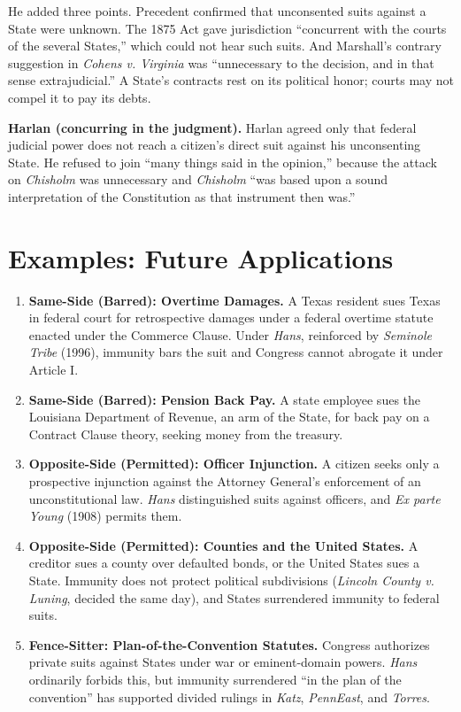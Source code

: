 \documentclass[12pt]{article}
\begin{document}
He added three points. Precedent confirmed that unconsented suits against a State were unknown. The 1875 Act gave jurisdiction ``concurrent with the courts of the several States,'' which could not hear such suits. And Marshall's contrary suggestion in \textit{Cohens v. Virginia} was ``unnecessary to the decision, and in that sense extrajudicial.'' A State's contracts rest on its political honor; courts may not compel it to pay its debts.

\textbf{Harlan (concurring in the judgment).} Harlan agreed only that federal judicial power does not reach a citizen's direct suit against his unconsenting State. He refused to join ``many things said in the opinion,'' because the attack on \textit{Chisholm} was unnecessary and \textit{Chisholm} ``was based upon a sound interpretation of the Constitution as that instrument then was.''

\section{Examples: Future Applications}

\begin{enumerate}
\item \textbf{Same-Side (Barred): Overtime Damages.} A Texas resident sues Texas in federal court for retrospective damages under a federal overtime statute enacted under the Commerce Clause. Under \textit{Hans}, reinforced by \textit{Seminole Tribe} (1996), immunity bars the suit and Congress cannot abrogate it under Article I.
\item \textbf{Same-Side (Barred): Pension Back Pay.} A state employee sues the Louisiana Department of Revenue, an arm of the State, for back pay on a Contract Clause theory, seeking money from the treasury.
\item \textbf{Opposite-Side (Permitted): Officer Injunction.} A citizen seeks only a prospective injunction against the Attorney General's enforcement of an unconstitutional law. \textit{Hans} distinguished suits against officers, and \textit{Ex parte Young} (1908) permits them.
\item \textbf{Opposite-Side (Permitted): Counties and the United States.} A creditor sues a county over defaulted bonds, or the United States sues a State. Immunity does not protect political subdivisions (\textit{Lincoln County v. Luning}, decided the same day), and States surrendered immunity to federal suits.
\item \textbf{Fence-Sitter: Plan-of-the-Convention Statutes.} Congress authorizes private suits against States under war or eminent-domain powers. \textit{Hans} ordinarily forbids this, but immunity surrendered ``in the plan of the convention'' has supported divided rulings in \textit{Katz}, \textit{PennEast}, and \textit{Torres}.
\end{enumerate}
\end{document}
